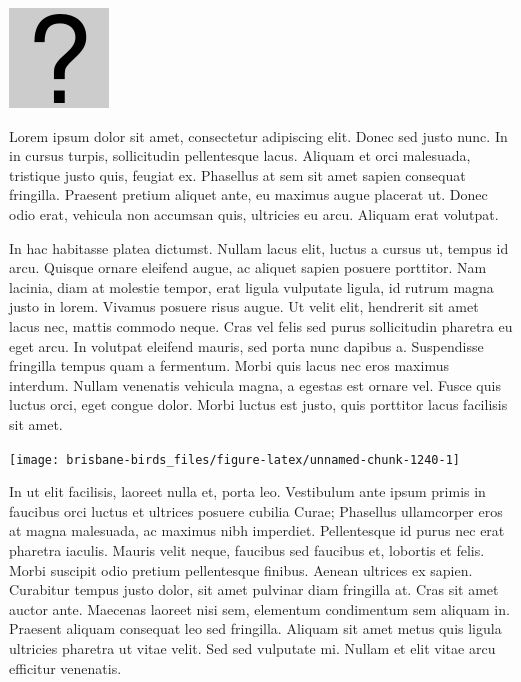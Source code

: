\documentclass[]{book}
\let\origfigure\figure
\let\endorigfigure\endfigure
\renewenvironment{figure}[1][2] {
  \expandafter\origfigure\expandafter[H]
} {
  \endorigfigure
}
\begin{document}
\begin{figure}
\centering
\includegraphics{assets/missing.png}
\caption{No image for species}
\end{figure}

Lorem ipsum dolor sit amet, consectetur adipiscing elit. Donec sed justo
nunc. In in cursus turpis, sollicitudin pellentesque lacus. Aliquam et
orci malesuada, tristique justo quis, feugiat ex. Phasellus at sem sit
amet sapien consequat fringilla. Praesent pretium aliquet ante, eu
maximus augue placerat ut. Donec odio erat, vehicula non accumsan quis,
ultricies eu arcu. Aliquam erat volutpat.

In hac habitasse platea dictumst. Nullam lacus elit, luctus a cursus ut,
tempus id arcu. Quisque ornare eleifend augue, ac aliquet sapien posuere
porttitor. Nam lacinia, diam at molestie tempor, erat ligula vulputate
ligula, id rutrum magna justo in lorem. Vivamus posuere risus augue. Ut
velit elit, hendrerit sit amet lacus nec, mattis commodo neque. Cras vel
felis sed purus sollicitudin pharetra eu eget arcu. In volutpat eleifend
mauris, sed porta nunc dapibus a. Suspendisse fringilla tempus quam a
fermentum. Morbi quis lacus nec eros maximus interdum. Nullam venenatis
vehicula magna, a egestas est ornare vel. Fusce quis luctus orci, eget
congue dolor. Morbi luctus est justo, quis porttitor lacus facilisis sit
amet.

\begin{figure}
\texttt{[image: brisbane-birds\_files/figure-latex/unnamed-chunk-1240-1]} \caption{insert figure caption}\label{fig:unnamed-chunk-1240}
\end{figure}

In ut elit facilisis, laoreet nulla et, porta leo. Vestibulum ante ipsum
primis in faucibus orci luctus et ultrices posuere cubilia Curae;
Phasellus ullamcorper eros at magna malesuada, ac maximus nibh
imperdiet. Pellentesque id purus nec erat pharetra iaculis. Mauris velit
neque, faucibus sed faucibus et, lobortis et felis. Morbi suscipit odio
pretium pellentesque finibus. Aenean ultrices ex sapien. Curabitur
tempus justo dolor, sit amet pulvinar diam fringilla at. Cras sit amet
auctor ante. Maecenas laoreet nisi sem, elementum condimentum sem
aliquam in. Praesent aliquam consequat leo sed fringilla. Aliquam sit
amet metus quis ligula ultricies pharetra ut vitae velit. Sed sed
vulputate mi. Nullam et elit vitae arcu efficitur venenatis.
\end{document}
